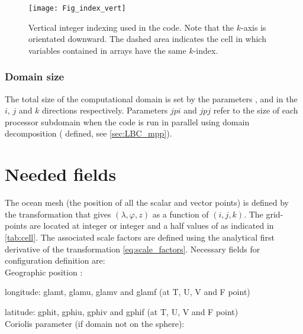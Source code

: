 \documentclass[../main/NEMO_manual]{subfiles}
\begin{document}
\begin{figure}[!pt]
  \begin{center}
    \texttt{[image: Fig\_index\_vert]}
    \caption{
      \protect\label{fig:index_vert}
      Vertical integer indexing used in the \fortran code.
      Note that the $k$-axis is orientated downward.
      The dashed area indicates the cell in which variables contained in arrays have the same $k$-index.
    }
  \end{center}
\end{figure}

\subsubsection{Domain size}
\label{subsec:DOM_size}

The total size of the computational domain is set by the parameters ,
 and  in the $i$, $j$ and $k$ directions respectively.
Parameters $jpi$ and $jpj$ refer to the size of each processor subdomain when
the code is run in parallel using domain decomposition ( defined,
see \autoref{sec:LBC_mpp}).

\section{Needed fields}
\label{sec:DOM_fields}
The ocean mesh (\ie the position of all the scalar and vector points) is defined by the transformation that gives $(\lambda,\varphi,z)$ as a function of $(i,j,k)$.
The grid-points are located at integer or integer and a half values of as indicated in \autoref{tab:cell}.
The associated scale factors are defined using the analytical first derivative of the transformation
\autoref{eq:scale_factors}.
Necessary fields for configuration definition are: \\
Geographic position :

longitude: glamt, glamu, glamv and glamf (at T, U, V and F point)

latitude: gphit, gphiu, gphiv and gphif (at T, U, V and F point)\\
Coriolis parameter (if domain not on the sphere): 
\end{document}
